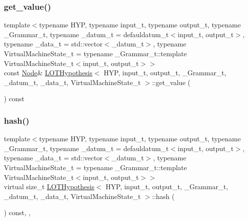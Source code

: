 \mbox{\label{class_l_o_t_hypothesis_aea6cd096e4ea5967e9932475ecae472a}} 
\subsubsection{\texorpdfstring{get\+\_\+value()}{get\_value()}\hspace{0.1cm}{\footnotesize\ttfamily [2/2]}}
{\footnotesize\ttfamily template$<$typename H\+YP, typename input\+\_\+t, typename output\+\_\+t, typename \+\_\+\+Grammar\+\_\+t, typename \+\_\+datum\+\_\+t = defauldatum\+\_\+t$<$input\+\_\+t, output\+\_\+t$>$, typename \+\_\+data\+\_\+t = std\+::vector$<$\+\_\+datum\+\_\+t$>$, typename Virtual\+Machine\+State\+\_\+t = typename \+\_\+\+Grammar\+\_\+t\+::template Virtual\+Machine\+State\+\_\+t$<$input\+\_\+t, output\+\_\+t$>$$>$ \\
const \hyperlink{class_node}{Node}\& \hyperlink{class_l_o_t_hypothesis}{L\+O\+T\+Hypothesis}$<$ H\+YP, input\+\_\+t, output\+\_\+t, \+\_\+\+Grammar\+\_\+t, \+\_\+datum\+\_\+t, \+\_\+data\+\_\+t, Virtual\+Machine\+State\+\_\+t $>$\+::get\+\_\+value (\begin{DoxyParamCaption}{ }\end{DoxyParamCaption}) const\hspace{0.3cm}{\ttfamily [inline]}}

\mbox{\label{class_l_o_t_hypothesis_a7c33d51f8d81762b1eca7f86b596236a}} 
\subsubsection{\texorpdfstring{hash()}{hash()}}
{\footnotesize\ttfamily template$<$typename H\+YP, typename input\+\_\+t, typename output\+\_\+t, typename \+\_\+\+Grammar\+\_\+t, typename \+\_\+datum\+\_\+t = defauldatum\+\_\+t$<$input\+\_\+t, output\+\_\+t$>$, typename \+\_\+data\+\_\+t = std\+::vector$<$\+\_\+datum\+\_\+t$>$, typename Virtual\+Machine\+State\+\_\+t = typename \+\_\+\+Grammar\+\_\+t\+::template Virtual\+Machine\+State\+\_\+t$<$input\+\_\+t, output\+\_\+t$>$$>$ \\
virtual size\+\_\+t \hyperlink{class_l_o_t_hypothesis}{L\+O\+T\+Hypothesis}$<$ H\+YP, input\+\_\+t, output\+\_\+t, \+\_\+\+Grammar\+\_\+t, \+\_\+datum\+\_\+t, \+\_\+data\+\_\+t, Virtual\+Machine\+State\+\_\+t $>$\+::hash (\begin{DoxyParamCaption}{ }\end{DoxyParamCaption}) const\hspace{0.3cm}{\ttfamily [inline]}, {\ttfamily [override]}, {\ttfamily [virtual]}}



